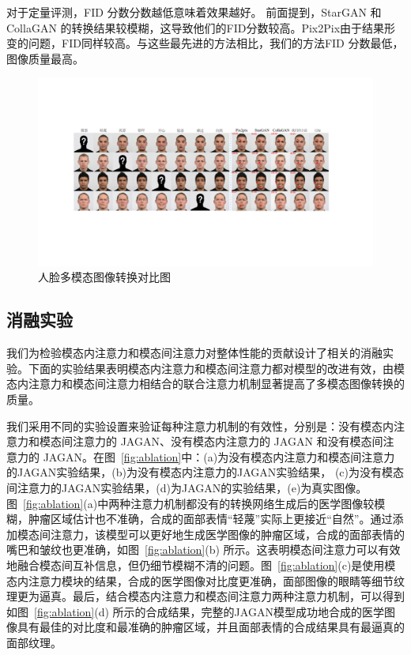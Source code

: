 对于定量评测，FID 分数分数越低意味着效果越好。 前面提到，StarGAN 和 CollaGAN 的转换结果较模糊，这导致他们的FID分数较高。Pix2Pix由于结果形变的问题，FID同样较高。与这些最先进的方法相比，我们的方法FID 分数最低，图像质量最高。

\begin{figure}
	\begin{center}
		\includegraphics[width=1\columnwidth]{figures/JAGAN/comparsion_facial.pdf}
	\end{center}
	\caption{人脸多模态图像转换对比图}
	\label{fig:comparsion_facial}
\end{figure}

\subsection{消融实验}

我们为检验模态内注意力和模态间注意力对整体性能的贡献设计了相关的消融实验。下面的实验结果表明模态内注意力和模态间注意力都对模型的改进有效，由模态内注意力和模态间注意力相结合的联合注意力机制显著提高了多模态图像转换的质量。

我们采用不同的实验设置来验证每种注意力机制的有效性，分别是：没有模态内注意力和模态间注意力的 JAGAN、没有模态内注意力的 JAGAN 和没有模态间注意力的 JAGAN。在图~\ref{fig:ablation}中：(a)为没有模态内注意力和模态间注意力的JAGAN实验结果，(b)为没有模态内注意力的JAGAN实验结果， (c)为没有模态间注意力的JAGAN实验结果，(d)为JAGAN的实验结果，(e)为真实图像。图~\ref{fig:ablation}(a)中两种注意力机制都没有的转换网络生成后的医学图像较模糊，肿瘤区域估计也不准确，合成的面部表情“轻蔑”实际上更接近“自然”。通过添加模态间注意力，该模型可以更好地生成医学图像的肿瘤区域，合成的面部表情的嘴巴和皱纹也更准确，如图~\ref{fig:ablation}(b) 所示。这表明模态间注意力可以有效地融合模态间互补信息，但仍细节模糊不清的问题。图~\ref{fig:ablation}(c)是使用模态内注意力模块的结果，合成的医学图像对比度更准确，面部图像的眼睛等细节纹理更为逼真。最后，结合模态内注意力和模态间注意力两种注意力机制，可以得到如图~\ref{fig:ablation}(d) 所示的合成结果，完整的JAGAN模型成功地合成的医学图像具有最佳的对比度和最准确的肿瘤区域，并且面部表情的合成结果具有最逼真的面部纹理。

